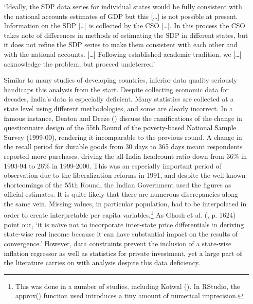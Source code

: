 \documentclass[a4paper, 11pt]{article}
\begin{document}
\begin{displayquote}[!t]
‘Ideally, the SDP data series for individual states would be fully consistent with the national accounts estimates of GDP but this […] is not possible at present.  Information on the SDP […] is collected by the CSO […].  In this process the CSO takes note of differences in methods of estimating the SDP in different states, but it does not refine the SDP series to make them consistent with each other and with the national accounts. […] Following established academic tradition, we […] acknowledge the problem, but proceed undeterred’ \citep{ahluwalia_state-level_2000}
\end{displayquote}\par
Similar to many studies of developing countries, inferior data quality seriously handicaps this analysis from the start.  Despite collecting economic data for decades, India’s data is especially deficient.  Many statistics are collected at a state level using different methodologies, and some are clearly incorrect.  In a famous instance, Deaton and Dreze (\citeyear{dreze_poverty_2002}) discuss the ramifications of the change in questionnaire design of the 55th Round of the poverty-based National Sample Survey (1999-00), rendering it incomparable to the previous round.  A change in the recall period for durable goods from 30 days to 365 days meant respondents reported more purchases, driving the all-India headcount ratio down from 36\% in 1993-94 to 26\% in 1999-2000.  This was an especially important period of observation due to the liberalization reforms in 1991, and despite the well-known shortcomings of the 55th Round, the Indian Government used the figures as official estimates.  It is quite likely that there are numerous discrepancies along the same vein.  Missing values, in particular population, had to be interpolated in order to create interpretable per capita variables.\footnote{This was done in a number of studies, including Kotwal (\citeyear{kotwal_economic_2011}).  In RStudio, the approx() function used introduces a tiny amount of numerical imprecision.}  As Ghosh et al. (\citeyear{ghosh_economic_1998}, p. 1624) point out, ‘it is naïve not to incorporate inter-state price differentials in deriving state-wise real income because it can have substantial impact on the results of convergence.’  However, data constraints prevent the inclusion of a state-wise inflation regressor as well as statistics for private investment, yet a large part of the literature carries on with analysis despite this data deficiency. \par
\end{document}
